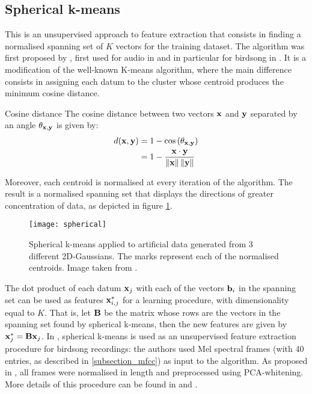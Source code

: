 \documentclass[../main.tex]{subfiles} \label{chapter_soa}
\begin{document}
\subsection{Spherical k-means} \label{subsection_spherical}
This is an unsupervised approach to feature extraction that consists in finding a normalised spanning set of $K$ vectors for the training dataset. The algorithm was first proposed by \cite{Coates2012}, first used for audio in \cite{Dieleman2013} and in particular for birdsong in \cite{Stowell2014}. It is a modification of the well-known K-means algorithm, where the main difference consists in assigning each datum to the cluster whose centroid produces the minimum cosine distance.
\begin{definition}{Cosine distance} \label{def_cosine_distance}
The cosine distance between two vectors $\mathbf{x}$ and $\mathbf{y}$ separated by an angle $\theta_{\mathbf{x}, \mathbf{y}}$ is given by:
\begin{align*}
d(\mathbf{x}, \mathbf{y}) &= 1 - \cos{(\theta_{\mathbf{x}, \mathbf{y}})}\\
&= 1 - \frac{\mathbf{x} \cdot \mathbf{y}}{\left\lVert\mathbf{x}\right\rVert\left\lVert\mathbf{y}\right\rVert}
\end{align*}
\end{definition}
\par Moreover, each centroid is normalised at every iteration of the algorithm. The result is a normalised spanning set that displays the directions of greater concentration of data, as depicted in figure \ref{fig_spherical}.

\begin{figure}[t]
\centering
\texttt{[image: spherical]}
\caption{Spherical k-means applied to artificial data generated from 3 different 2D-Gaussians. The marks represent each of the normalised centroids. Image taken from \cite{Stowell2014}.}
\label{fig_spherical}
\end{figure}
\par The dot product of each datum $\mathbf{x}_j$ with each of the vectors $\mathbf{b}_i$ in the spanning set can be used as features $\mathbf{x}^*_{i,j}$ for a learning procedure, with dimensionality equal to $K$. That is, let $\mathbf{B}$ be the matrix whose rows are the vectors in the spanning set found by spherical k-means, then the new features are given by $\mathbf{x}^*_j = \mathbf{Bx}_j$. In \cite{Stowell2014}, spherical k-means is used as an unsupervised feature extraction procedure for birdsong recordings: the authors used Mel spectral frames (with 40 entries, as described in \ref{subsection_mfcc}) as input to the algorithm. As proposed in \cite{Dieleman2013}, all frames were normalised in length and preprocessed using PCA-whitening. More details of this procedure can be found in \cite{Stowell2014} and \cite{Dieleman2013}.
\end{document}
